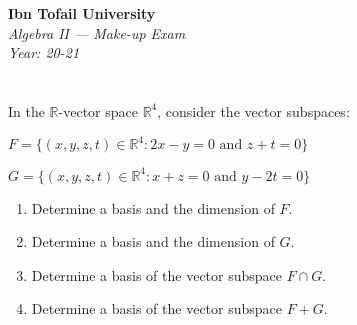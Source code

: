 \documentclass[12pt]{article}
\begin{document}
\begin{center}
  \Large\textbf{Ibn Tofail University} \\[1em]
  \large\textit{Algebra II — Make-up Exam} \\[0.5em]
  \large\textit{Year: 20-21} \\[2em]
\end{center}

\vspace{0.5cm}

\section{}
In the $\mathbb{R}$-vector space $\mathbb{R}^4$, consider the vector subspaces:

$F = \{(x,y,z,t) \in \mathbb{R}^4 : 2x - y = 0 \text{ and } z + t = 0\}$

$G = \{(x,y,z,t) \in \mathbb{R}^4 : x + z = 0 \text{ and } y - 2t = 0\}$

\begin{enumerate}
    \item Determine a basis and the dimension of $F$.

    \item Determine a basis and the dimension of $G$.

    \item Determine a basis of the vector subspace $F \cap G$.

    \item Determine a basis of the vector subspace $F + G$.
\end{enumerate}

\newpage
\end{document}
